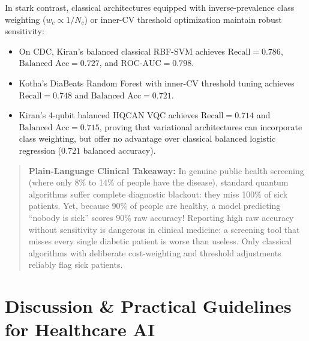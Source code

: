 \documentclass[journal,twocolumn]{IEEEtran}
\begin{document}
In stark contrast, classical architectures equipped with inverse-prevalence class weighting ($w_c \propto 1/N_c$) or inner-CV threshold optimization maintain robust sensitivity:
\begin{itemize}
    \item On CDC, Kiran's balanced classical RBF-SVM achieves $\text{Recall} = 0.786$, $\text{Balanced Acc} = 0.727$, and $\text{ROC-AUC} = 0.798$.
    \item Kotha's DiaBeats Random Forest with inner-CV threshold tuning achieves $\text{Recall} = 0.748$ and $\text{Balanced Acc} = 0.721$.
    \item Kiran's 4-qubit balanced HQCAN VQC achieves $\text{Recall} = 0.714$ and $\text{Balanced Acc} = 0.715$, proving that variational architectures can incorporate class weighting, but offer no advantage over classical balanced logistic regression ($0.721$ balanced accuracy).
\end{itemize}

\begin{quote}
\small
\textbf{Plain-Language Clinical Takeaway:} In genuine public health screening (where only 8\% to 14\% of people have the disease), standard quantum algorithms suffer complete diagnostic blackout: they miss 100\% of sick patients. Yet, because 90\% of people are healthy, a model predicting ``nobody is sick'' scores 90\% raw accuracy! Reporting high raw accuracy without sensitivity is dangerous in clinical medicine: a screening tool that misses every single diabetic patient is worse than useless. Only classical algorithms with deliberate cost-weighting and threshold adjustments reliably flag sick patients.
\end{quote}

\section{Discussion \& Practical Guidelines for Healthcare AI}
\label{sec:discussion}
\end{document}
